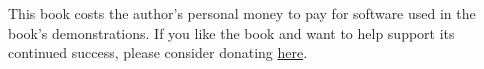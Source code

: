 This book costs the author's personal money to pay for software used in the
book's demonstrations. If you like the book and want to help support its
continued success, please consider donating
\href{https://www.paypal.com/cgi-bin/webscr?cmd=_donations&business=KA9QZVDMVYN26&lc=US&item_name=Evolving%20Technology%20Study%20Guide&item_number=42518&currency_code=USD&bn=PP%2dDonationsBF%3abtn_donate_LG%2egif%3aNonHosted}{here}.

